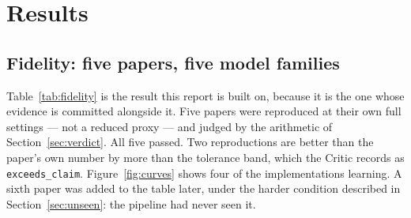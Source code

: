 \documentclass[10pt,twocolumn]{article}
\begin{document}
\section{Results}
\label{sec:results}

\subsection{Fidelity: five papers, five model families}
\label{sec:results5}

Table~\ref{tab:fidelity} is the result this report is built on, because it is the one whose
evidence is committed alongside it. Five papers were reproduced at their own full settings ---
not a reduced proxy --- and judged by the arithmetic of Section~\ref{sec:verdict}. All five
passed. Two reproductions are better than the paper's own number by more than the tolerance
band, which the Critic records as \texttt{exceeds\_claim}. Figure~\ref{fig:curves} shows four of
the implementations learning. A sixth paper was added to the table later, under the harder
condition described in Section~\ref{sec:unseen}: the pipeline had never seen it.
\end{document}
